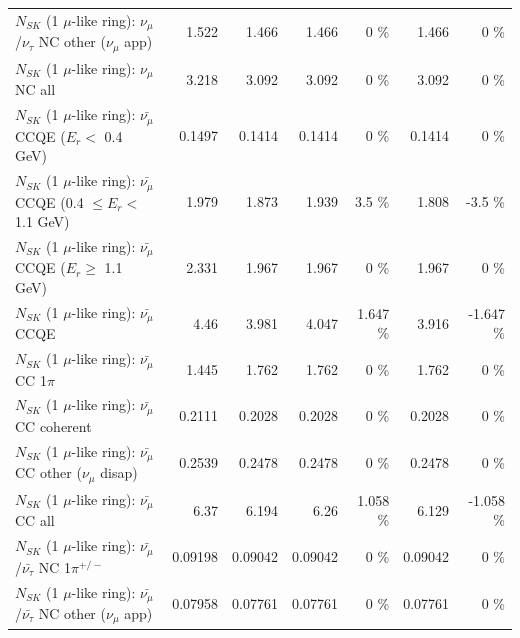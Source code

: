 \begin{table}
\begin{tabular}{| l | r | r | r  r | r  r |}
     $N_{SK}$ (1 $\mu$-like ring): $\nu_\mu$/$\nu_\tau$ NC other ($\nu_\mu$ app) &           1.522 &           1.466 &           1.466 &        0 \%  &           1.466 &        0 \%  \\ 
                                $N_{SK}$ (1 $\mu$-like ring): $\nu_{\mu}$ NC all &           3.218 &           3.092 &           3.092 &        0 \%  &           3.092 &        0 \%  \\ 
\hline
\hline
\hline
          $N_{SK}$ (1 $\mu$-like ring): $\bar{\nu_\mu}$ CCQE ($E_{r} <$ 0.4 GeV) &          0.1497 &          0.1414 &          0.1414 &        0 \%  &          0.1414 &        0 \%  \\ 
 $N_{SK}$ (1 $\mu$-like ring): $\bar{\nu_\mu}$ CCQE (0.4 $\leq E_{r} <$ 1.1 GeV) &           1.979 &           1.873 &           1.939 &      3.5 \%  &           1.808 &     -3.5 \%  \\ 
       $N_{SK}$ (1 $\mu$-like ring): $\bar{\nu_\mu}$ CCQE ($E_{r} \geq$ 1.1 GeV) &           2.331 &           1.967 &           1.967 &        0 \%  &           1.967 &        0 \%  \\ 
\hline
                              $N_{SK}$ (1 $\mu$-like ring): $\bar{\nu_\mu}$ CCQE &            4.46 &           3.981 &           4.047 &    1.647 \%  &           3.916 &   -1.647 \%  \\ 
                         $N_{SK}$ (1 $\mu$-like ring): $\bar{\nu_\mu}$ CC 1$\pi$ &           1.445 &           1.762 &           1.762 &        0 \%  &           1.762 &        0 \%  \\ 
                       $N_{SK}$ (1 $\mu$-like ring): $\bar{\nu_\mu}$ CC coherent &          0.2111 &          0.2028 &          0.2028 &        0 \%  &          0.2028 &        0 \%  \\ 
        $N_{SK}$ (1 $\mu$-like ring): $\bar{\nu_\mu}$ CC other ($\nu_\mu$ disap) &          0.2539 &          0.2478 &          0.2478 &        0 \%  &          0.2478 &        0 \%  \\ 
                          $N_{SK}$ (1 $\mu$-like ring): $\bar{\nu_{\mu}}$ CC all &            6.37 &           6.194 &            6.26 &    1.058 \%  &           6.129 &   -1.058 \%  \\ 
\hline
  $N_{SK}$ (1 $\mu$-like ring): $\bar{\nu_\mu}$/$\bar{\nu_\tau}$ NC 1$\pi^{+/-}$ &         0.09198 &         0.09042 &         0.09042 &        0 \%  &         0.09042 &        0 \%  \\ 
$N_{SK}$ (1 $\mu$-like ring): $\bar{\nu_\mu}$/$\bar{\nu_\tau}$ NC other ($\nu_\mu$ app) &         0.07958 &         0.07761 &         0.07761 &        0 \%  &         0.07761 &        0 \%  \\ 

\end{tabular}
\end{table}
